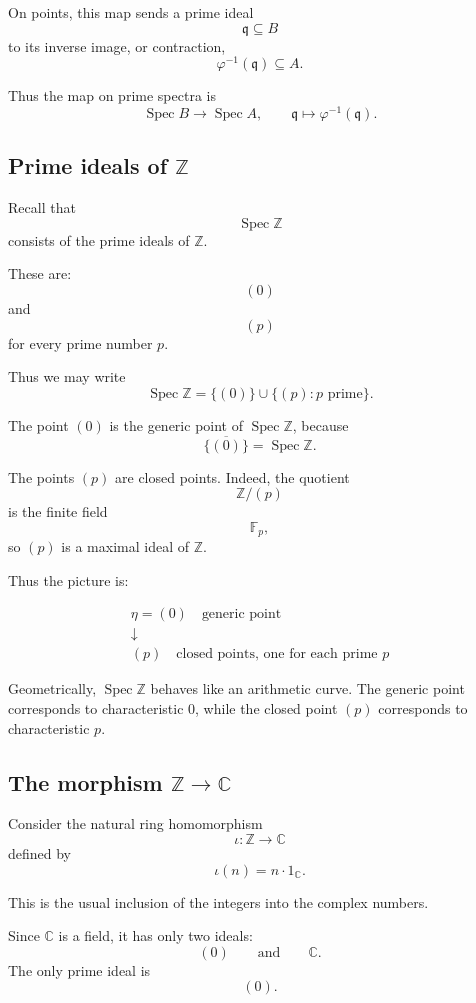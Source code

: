 \documentclass[12pt,a4paper]{article}
\DeclareMathOperator{\Spec}{Spec}
\theoremstyle{notespace}
\begin{document}
On points, this map sends a prime ideal
\[
\mathfrak q\subseteq B
\]
to its inverse image, or contraction,
\[
\varphi^{-1}(\mathfrak q)\subseteq A.
\]

Thus the map on prime spectra is
\[
\Spec B\to \Spec A,
\qquad
\mathfrak q\mapsto \varphi^{-1}(\mathfrak q).
\]

\subsection{Prime ideals of \texorpdfstring{\(\mathbb Z\)}{Z}}

Recall that
\[
\Spec \mathbb Z
\]
consists of the prime ideals of \(\mathbb Z\).

These are:
\[
(0)
\]
and
\[
(p)
\]
for every prime number \(p\).

Thus we may write
\[
\Spec \mathbb Z
=
\{(0)\}\cup \{(p):p\text{ prime}\}.
\]

The point \((0)\) is the generic point of \(\Spec\mathbb Z\), because
\[
\overline{\{(0)\}}=\Spec\mathbb Z.
\]

The points \((p)\) are closed points. Indeed, the quotient
\[
\mathbb Z/(p)
\]
is the finite field
\[
\mathbb F_p,
\]
so \((p)\) is a maximal ideal of \(\mathbb Z\).

Thus the picture is:

\[
\begin{array}{c}
	\eta=(0)\quad \text{generic point}
	\\[6pt]
	\downarrow
	\\[6pt]
	(p)\quad \text{closed points, one for each prime }p
\end{array}
\]

Geometrically, \(\Spec\mathbb Z\) behaves like an arithmetic curve. The generic point corresponds to characteristic \(0\), while the closed point \((p)\) corresponds to characteristic \(p\).

\subsection{The morphism \texorpdfstring{\(\mathbb Z\to \mathbb C\)}{Z to C}}

Consider the natural ring homomorphism
\[
\iota:\mathbb Z\longrightarrow \mathbb C
\]
defined by
\[
\iota(n)=n\cdot 1_{\mathbb C}.
\]

This is the usual inclusion of the integers into the complex numbers.

Since \(\mathbb C\) is a field, it has only two ideals:
\[
(0)
\qquad\text{and}\qquad
\mathbb C.
\]
The only prime ideal is
\[
(0).
\]
\end{document}
